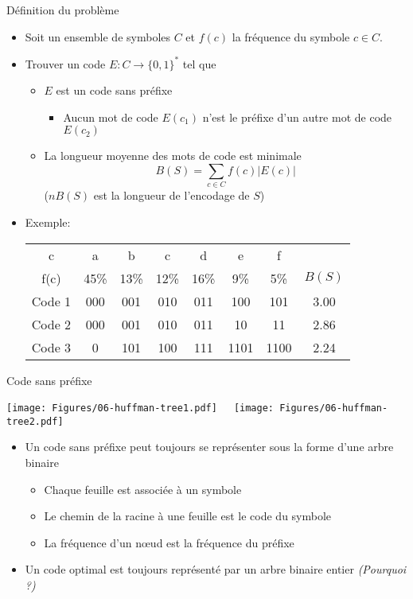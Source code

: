 \begin{frame}{Définition du problème}
\begin{itemize}
\item Soit un ensemble de symboles $C$ et $f(c)$ la fréquence du symbole $c\in C$.
\item Trouver un code $E: C\rightarrow \{0,1\}^*$ tel que
\begin{itemize}
\item $E$ est un code \alert{sans préfixe}
\begin{itemize}
\item Aucun mot de code $E(c_1)$ n'est le préfixe d'un autre mot de code $E(c_2)$
\end{itemize}
\item La longueur moyenne des mots de code est \alert{minimale}
$$B(S)=\sum_{c\in C} f(c)|E(c)|$$
($n B(S)$ est la longueur de l'encodage de $S$)
\end{itemize}
\item Exemple:
\begin{center}\small
\begin{tabular}{c|cccccc|c}
c & a & b & c & d & e & f & \\
f(c) & 45\% & 13\% & 12\% & 16\% & 9\% & 5\% & $B(S)$\\
\hline
Code 1 & 000 & 001 & 010 & 011 & 100& 101 & 3.00\\
Code 2 & 000 & 001 & 010 & 011 & 10& 11 & 2.86\\
Code 3 & 0 & 101 & 100 & 111 & 1101 & 1100 & 2.24\\
\end{tabular}
\end{center}
\end{itemize}

\end{frame}

\begin{frame}{Code sans préfixe}

\centerline{\texttt{[image: Figures/06-huffman-tree1.pdf]}~~~\texttt{[image: Figures/06-huffman-tree2.pdf]}}

\begin{itemize}
\item Un code sans préfixe peut toujours se représenter sous la forme d'une arbre binaire
\begin{itemize}
\item Chaque feuille est associée à un symbole
\item Le chemin de la racine à une feuille est le code du symbole
\item La fréquence d'un n\oe ud est la fréquence du préfixe
\end{itemize}
\item Un code optimal est toujours représenté par un arbre binaire entier {\it (Pourquoi ?)}
\end{itemize}

\end{frame}

